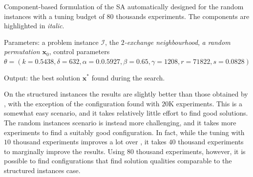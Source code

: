 \begin{algorithm}[ht!]

	  \caption{Component-based formulation of the SA automatically designed for 
	  the random instances with a tuning budget of $80$ thousands experiments. 
	  The components are highlighted in \textit{italic}.}
     \label{algo:allsarr}
    
    Parameters: a problem instance $\mathcal{I}$, the \textit{$2$-exchange neighbourhood}, 
    \textit{a random permutation $\mathbf{x}_0$}, control parameters 
    $\theta = (k = 0.5438, \delta = 632, \alpha = 0.0.5927, \beta = 0.65, \gamma = 1208, r = 71822, s = 0.0828)$
    
    Output: the best solution $\mathbf{x^*}$ found during the search.
    
	\begin{algorithmic}[1] 
		\ENDIF
		\ENDIF
		\ENDIF
		\ENDWHILE
	\end{algorithmic}
\end{algorithm}

On the structured instances the results are slightly better than those obtained
by \brsa, with the exception of the configuration found with $20$K experiments.
This is a somewhat easy scenario, and it takes relatively little effort
to find good solutions. 
The random instances scenario is instead more challenging, and it takes 
more experiments to find a suitably good configuration. In fact, while
the tuning with $10$ thousand experiments improves a lot over \brsa,
it takes $40$ thousand experiments to marginally improve the results. Using
$80$ thousand experiments, however, it is possible to find configurations that
find solution qualities comparable to the structured instances case.

